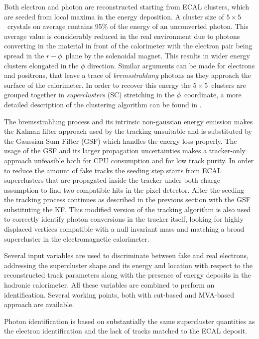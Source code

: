 Both electron and photon are reconstructed starting from ECAL clusters, which are seeded from local maxima in the energy deposition. A cluster size of $5\times5$\ crystals on average contains 95\% of the energy of an unconverted photon. This average value is considerably reduced in the real environment due to photons converting in the material in front of the calorimeter with the electron pair being spread in the $r-\phi$\ plane by the solenoidal magnet. This results in wider energy clusters elongated in the $\phi$ direction. Similar arguments can be made for electrons and positrons, that leave a trace of \emph{bremsstrahlung} photons as they approach the surface of the calorimeter. In order to recover this energy the $5\times5$\ clusters are grouped together in \emph{superclusters} (SC) stretching in the $\phi$\ coordinate, a more detailed description of the clustering algorithm can be found in \cite{CMS:2006tdr1}.

The bremsstrahlung process and its intrinsic non-gaussian energy emission makes the Kalman filter approach used by the tracking unsuitable and is substituted by the Gaussian Sum Filter (GSF) \cite{gsf} which handles the energy loss properly. The usage of the GSF and its larger propagation uncertainties makes a tracker-only approach unfeasible both for CPU consumption and for low track purity. In order to reduce the amount of fake tracks the seeding step starts from ECAL superclusters that are propagated inside the tracker under both charge assumption to find two compatible hits in the pixel detector. After the seeding the tracking process continues as described in the previous section with the GSF substituting the KF. This modified version of the tracking algorithm is also used to correctly identify photon conversions in the tracker itself, looking for highly displaced vertices compatible with a null invariant mass and matching a broad supercluster in the electromagnetic calorimeter.

Several input variables are used to discriminate between fake and real electrons, addressing the supercluster shape and its energy and location with respect to the reconstructed track parameters along with the presence of energy deposits in the hadronic calorimeter. All these variables are combined to perform an identification. Several working points, both with cut-based and MVA-based approach are available.

Photon identification is based on substantially the same supercluster quantities as the electron identification and the lack of tracks matched to the ECAL deposit.  

